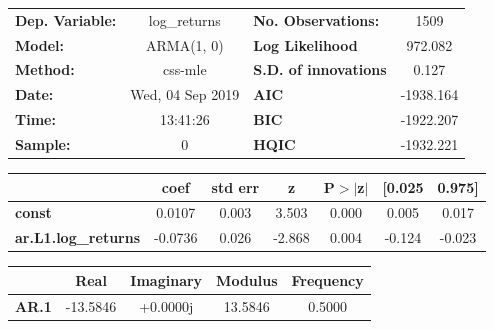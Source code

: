 \begin{center}
\begin{tabular}{lclc}
\toprule
\textbf{Dep. Variable:}     &        log\_returns       & \textbf{  No. Observations:  } &            1509            \\
\textbf{Model:}             &         ARMA(1, 0)        & \textbf{  Log Likelihood     } &          972.082           \\
\textbf{Method:}            &          css-mle          & \textbf{  S.D. of innovations} &           0.127            \\
\textbf{Date:}              &      Wed, 04 Sep 2019     & \textbf{  AIC                } &         -1938.164          \\
\textbf{Time:}              &          13:41:26         & \textbf{  BIC                } &         -1922.207          \\
\textbf{Sample:}            &             0             & \textbf{  HQIC               } &         -1932.221          \\
\bottomrule
\end{tabular}
\begin{tabular}{lcccccc}
                            & \textbf{coef} & \textbf{std err} & \textbf{z} & \textbf{P$> |$z$|$} & \textbf{[0.025} & \textbf{0.975]}  \\
\midrule
\textbf{const}              &       0.0107  &        0.003     &     3.503  &         0.000        &        0.005    &        0.017     \\
\textbf{ar.L1.log\_returns} &      -0.0736  &        0.026     &    -2.868  &         0.004        &       -0.124    &       -0.023     \\
\bottomrule
\end{tabular}
\begin{tabular}{lcccc}
              & \textbf{            Real} & \textbf{         Imaginary} & \textbf{         Modulus} & \textbf{        Frequency}  \\
\midrule
\textbf{AR.1} &              -13.5846     &                +0.0000j     &               13.5846     &                0.5000       \\
\bottomrule
\end{tabular}
\end{center}
